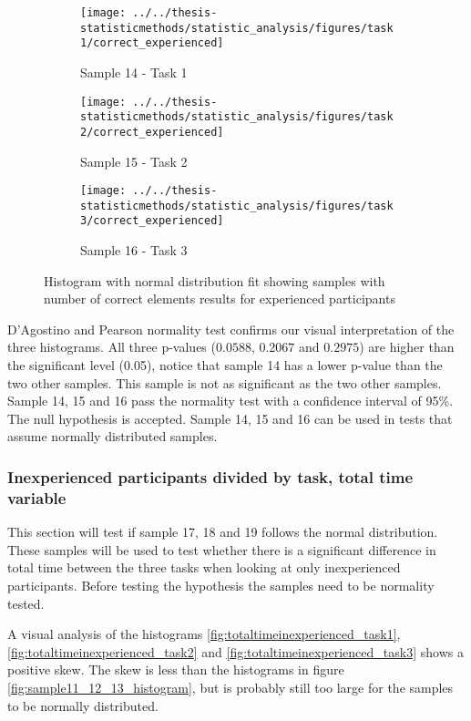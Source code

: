 \begin{figure}[H]
	\centering
	\begin{subfigure}[b]{0.32\textwidth}
		\centering
		\texttt{[image: ../../thesis-statisticmethods/statistic\_analysis/figures/task1/correct\_experienced]}
		\caption{Sample 14 - Task 1}
		\label{fig:correctexperienced_task1}
	\end{subfigure}
	\begin{subfigure}[b]{0.32\textwidth}
		\centering
		\texttt{[image: ../../thesis-statisticmethods/statistic\_analysis/figures/task2/correct\_experienced]}
		\caption{Sample 15 - Task 2}
		\label{fig:correctexperienced_task2}
	\end{subfigure}
	\begin{subfigure}[b]{0.32\textwidth}
		\centering
		\texttt{[image: ../../thesis-statisticmethods/statistic\_analysis/figures/task3/correct\_experienced]}
		\caption{Sample 16 - Task 3}
		\label{fig:correctexperienced_task3}
	\end{subfigure}
	\caption{Histogram with normal distribution fit showing samples with number of correct elements results for experienced participants}
	\label{fig:sample14,15,16_normhistogram}
\end{figure}

  D'Agostino and Pearson normality test confirms our visual interpretation of the three histograms. All three p-values ($0.0588$, $0.2067$ and $0.2975$) are higher than the significant level (0.05), notice that sample 14 has a lower p-value than the two other samples. This sample is not as significant as the two other samples. Sample 14, 15 and 16 pass the normality test with a confidence interval of 95\%. The null hypothesis is accepted. Sample 14, 15 and 16 can be used in tests that assume normally distributed samples.

\subsubsection[Sample 17, 18 and 19]{Inexperienced participants divided by task, total time variable}\label{sec:sample_17,18,19_normalitytest}
This section will test if sample 17, 18 and 19 follows the normal distribution. These samples will be used to test whether there is a significant difference in total time between the three tasks when looking at only inexperienced participants. Before testing the hypothesis the samples need to be normality tested. 

A visual analysis of the histograms \ref{fig:totaltimeinexperienced_task1}, \ref{fig:totaltimeinexperienced_task2} and \ref{fig:totaltimeinexperienced_task3} shows a positive skew. The skew is less than the histograms in figure \ref{fig:sample11_12_13_histogram}, but is probably still too large for the samples to be normally distributed.  

